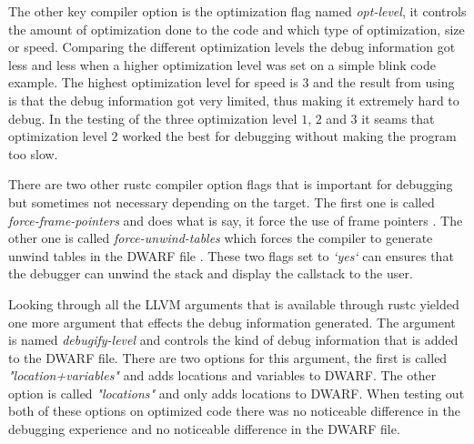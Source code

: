 The other key compiler option is the optimization flag named \emph{opt-level}, it controls the amount of optimization done to the code and which type of optimization, size or speed.
Comparing the different optimization levels the debug information got less and less when a higher optimization level was set on a simple blink code example.
The highest optimization level for speed is $3$ and the result from using is that the debug information got very limited, thus making it extremely hard to debug.
In the testing of the three optimization level $1$, $2$ and $3$ it seams that optimization level $2$ worked the best for debugging without making the program too slow.


There are two other \gls{rustc} compiler option flags that is important for debugging but sometimes not necessary depending on the target.
The first one is called \emph{force-frame-pointers} and does what is say, it force the use of frame pointers \cite{rustc-book-codegen}.
The other one is called \emph{force-unwind-tables} which forces the compiler to generate unwind tables in the \gls{DWARF} file \cite{rustc-book-codegen}.
These two flags set to \emph{`yes`} can ensures that the debugger can unwind the stack and display the callstack to the user.


Looking through all the \gls{LLVM} arguments that is available through \gls{rustc} yielded one more argument that effects the debug information generated.
The argument is named \emph{debugify-level} and controls the kind of debug information that is added to the \gls{DWARF} file.
There are two options for this argument, the first is called \emph{"location+variables"} and adds locations and variables to \gls{DWARF}.
The other option is called \emph{"locations"} and only adds locations to \gls{DWARF}.
When testing out both of these options on optimized code there was no noticeable difference in the debugging experience and no noticeable difference in the  \gls{DWARF} file.




%
%

